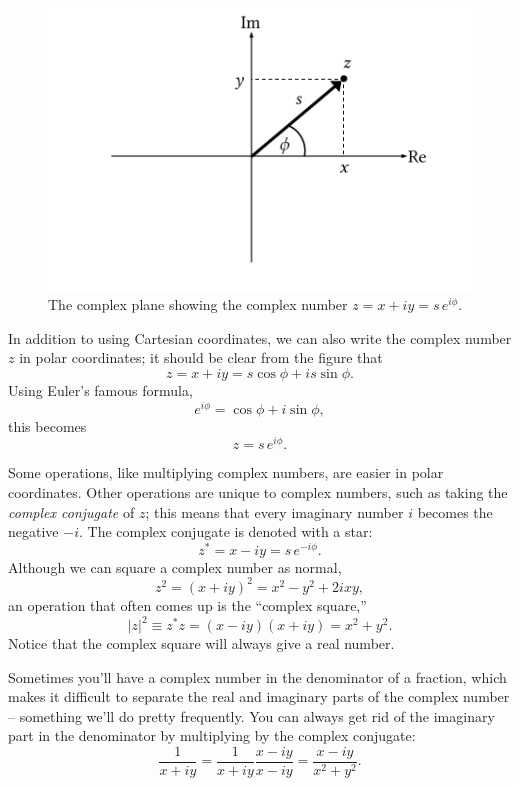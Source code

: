 \begin{figure}
\centering\includegraphics[width=0.7\linewidth]{Figures/Chapter4/fig_complex_plane}
\caption{The complex plane showing the complex number $z = x + iy = s \, e^{i\phi}$.}
\label{fig_complex_plane}
\end{figure}

In addition to using Cartesian coordinates, we can also write the complex number $z$ in polar coordinates; it should be clear from the figure that
\[
z = x + iy = s \cos \phi + is \sin \phi.
\]
Using Euler's famous formula,
\[
e^{i \phi} = \cos \phi + i \sin \phi,
\]
this becomes
\begin{equation}
z = s \, e^{i \phi}.
\end{equation}

Some operations, like multiplying complex numbers, are easier in polar coordinates.  Other operations are unique to complex numbers, such as taking the \emph{complex conjugate} of $z$; this means that every imaginary number $i$ becomes the negative $-i$.  The complex conjugate is denoted with a star:
\[
z^* = x - iy = s \, e^{-i\phi}.
\] 
Although we can square a complex number as normal,
\begin{equation}
\label{eq_z_squared}
z^2 = (x + iy)^2 = x^2 - y^2 + 2ixy,
\end{equation}
an operation that often comes up is the ``complex square,''
\begin{equation}
|z|^2 \equiv z^* z = (x-iy)(x+iy) = x^2 + y^2.
\end{equation}
Notice that the complex square will always give a real number.

Sometimes you'll have a complex number in the denominator of a fraction, which makes it difficult to separate the real and imaginary parts of the complex number -- something we'll do pretty frequently.  You can always get rid of the imaginary part in the denominator by multiplying by the complex conjugate:
\[
\frac{1}{x + iy} = \frac{1}{x+iy} \frac{x - iy}{x-iy} = \frac{x - iy}{x^2 + y^2}.
\]

